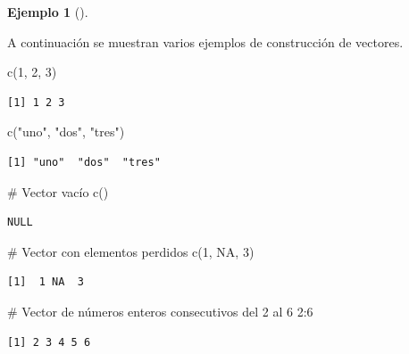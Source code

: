 \documentclass[
  a4paper,
]{scrreport}
\newenvironment{Shaded}{\begin{snugshade}}{\end{snugshade}}
\newcommand{\CommentTok}[1]{\textcolor[rgb]{0.37,0.37,0.37}{#1}}
\newcommand{\ConstantTok}[1]{\textcolor[rgb]{0.56,0.35,0.01}{#1}}
\newcommand{\DecValTok}[1]{\textcolor[rgb]{0.68,0.00,0.00}{#1}}
\newcommand{\FunctionTok}[1]{\textcolor[rgb]{0.28,0.35,0.67}{#1}}
\newcommand{\NormalTok}[1]{\textcolor[rgb]{0.00,0.23,0.31}{#1}}
\newcommand{\SpecialCharTok}[1]{\textcolor[rgb]{0.37,0.37,0.37}{#1}}
\newcommand{\StringTok}[1]{\textcolor[rgb]{0.13,0.47,0.30}{#1}}
\theoremstyle{definition}
\newtheorem{example}{Ejemplo}[chapter]
\theoremstyle{definition}
\theoremstyle{remark}
\begin{document}
\leavevmode{}%
\begin{example}[]\label{exm-construccion-vectores}

A continuación se muestran varios ejemplos de construcción de vectores.

\begin{Shaded}
\begin{Highlighting}[]
\FunctionTok{c}\NormalTok{(}\DecValTok{1}\NormalTok{, }\DecValTok{2}\NormalTok{, }\DecValTok{3}\NormalTok{)}
\end{Highlighting}
\end{Shaded}

\begin{verbatim}
[1] 1 2 3
\end{verbatim}

\begin{Shaded}
\begin{Highlighting}[]
\FunctionTok{c}\NormalTok{(}\StringTok{"uno"}\NormalTok{, }\StringTok{"dos"}\NormalTok{, }\StringTok{"tres"}\NormalTok{)}
\end{Highlighting}
\end{Shaded}

\begin{verbatim}
[1] "uno"  "dos"  "tres"
\end{verbatim}

\begin{Shaded}
\begin{Highlighting}[]
\CommentTok{\# Vector vacío}
\FunctionTok{c}\NormalTok{()}
\end{Highlighting}
\end{Shaded}

\begin{verbatim}
NULL
\end{verbatim}

\begin{Shaded}
\begin{Highlighting}[]
\CommentTok{\# Vector con elementos perdidos}
\FunctionTok{c}\NormalTok{(}\DecValTok{1}\NormalTok{, }\ConstantTok{NA}\NormalTok{, }\DecValTok{3}\NormalTok{)}
\end{Highlighting}
\end{Shaded}

\begin{verbatim}
[1]  1 NA  3
\end{verbatim}

\begin{Shaded}
\begin{Highlighting}[]
\CommentTok{\# Vector de números enteros consecutivos del 2 al 6}
\DecValTok{2}\SpecialCharTok{:}\DecValTok{6}
\end{Highlighting}
\end{Shaded}

\begin{verbatim}
[1] 2 3 4 5 6
\end{verbatim}

\end{example}
\end{document}
